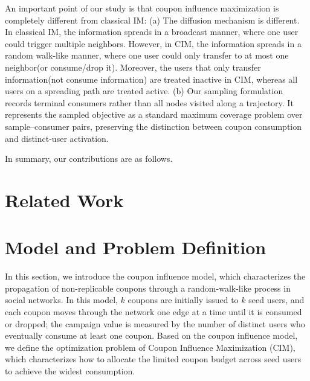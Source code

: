 \documentclass[sigconf]{acmart}
\begin{document}
An important point of our study is that coupon influence maximization is
completely different from classical IM:
(a) The diffusion mechanism is different. In classical IM, the information spreads in a broadcast manner, where one user could trigger multiple neighbors. However, in CIM, the information spreads in a random walk-like manner, where one user could only transfer to at most one neighbor(or consume/drop it). Moreover, the users that only transfer information(not consume information) are treated inactive in CIM, whereas all users on a spreading path are treated active. (b) Our sampling formulation records terminal consumers rather than all nodes visited along a trajectory. It represents the sampled objective as a standard maximum coverage problem over sample--consumer pairs, preserving the distinction between coupon consumption and distinct-user activation.



In summary, our contributions are as follows.


\section{Related Work}
\label{sec:related}


\section{Model and Problem Definition}
\label{sec:model}

In this section, we introduce the coupon influence model, which
characterizes the propagation of non-replicable coupons through a
random-walk-like process in social networks.
In this model, $k$ coupons are initially issued to $k$ seed users, and
each coupon moves through the network one edge at a time until it is
consumed or dropped; the campaign value is measured by the number of
distinct users who eventually consume at least one coupon.
Based on the coupon influence model, we define the optimization
problem of Coupon Influence Maximization (CIM), which characterizes
how to allocate the limited coupon budget across seed users to
achieve the widest consumption.
\end{document}
